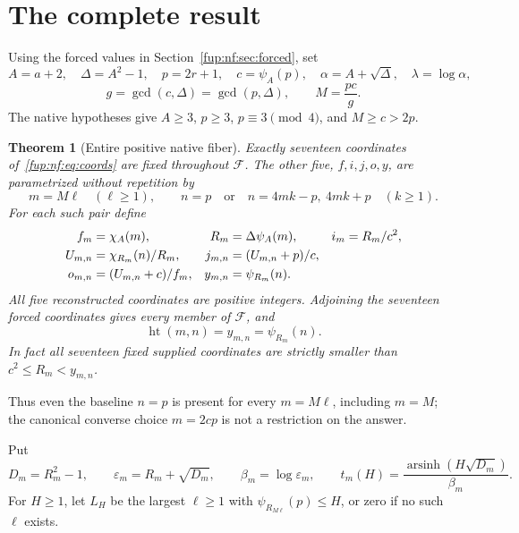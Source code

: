 \documentclass[11pt,letterpaper]{article}
\newtheorem{theorem}{Theorem}[section]
\theoremstyle{definition}\newtheorem{definition}[theorem]{Definition}
\theoremstyle{remark}\newtheorem{remark}[theorem]{Remark}
\DeclareMathOperator{\arsinh}{arsinh}
\begin{document}
\section{The complete result}\label{fup:nf:sec:main}
Using the forced values in Section~\ref{fup:nf:sec:forced}, set
\begin{equation}\label{fup:nf:eq:fixedparameters}
 A=a+2,\quad \Delta=A^2-1,\quad p=2r+1,\quad c=\psi_A(p),\quad
 \alpha=A+\sqrt\Delta,\quad \lambda=\log\alpha,
\end{equation}
\[
 g=\gcd(c,\Delta)=\gcd(p,\Delta),\qquad M=\frac{pc}{g}.
\]
The native hypotheses give $A\ge3$, $p\ge3$, $p\equiv3\pmod4$, and $M\ge c>2p$.

\begin{theorem}[Entire positive native fiber]\label{fup:nf:thm:class}
Exactly seventeen coordinates of~\eqref{fup:nf:eq:coords} are fixed throughout $\mathcal F$. The other five, $f,i,j,o,y$, are parametrized without repetition by
\begin{equation}\label{fup:nf:eq:indices}
 m=M\ell\quad(\ell\ge1),\qquad
 n=p\quad\text{or}\quad n=4mk-p,\ 4mk+p\quad(k\ge1).
\end{equation}
For each such pair define
\begin{align}\label{fup:nf:eq:reconstruct}
 f_m&=\chi_A(m),& R_m&=\Delta\psi_A(m),& i_m&=R_m/c^2,\notag\\
 U_{m,n}&=\chi_{R_m}(n)/R_m,& j_{m,n}&=(U_{m,n}+p)/c,\\
 o_{m,n}&=(U_{m,n}+c)/f_m,& y_{m,n}&=\psi_{R_m}(n).\notag
\end{align}
All five reconstructed coordinates are positive integers. Adjoining the seventeen forced coordinates gives every member of $\mathcal F$, and
\begin{equation}\label{fup:nf:eq:height}
 \operatorname{ht}(m,n)=y_{m,n}=\psi_{R_m}(n).
\end{equation}
In fact all seventeen fixed supplied coordinates are strictly smaller than $c^2\le R_m<y_{m,n}$.
\end{theorem}

Thus even the baseline $n=p$ is present for every $m=M\ell$, including $m=M$; the canonical converse choice $m=2cp$ is not a restriction on the answer.

Put
\[
 D_m=R_m^2-1,\qquad \varepsilon_m=R_m+\sqrt{D_m},\qquad
 \beta_m=\log\varepsilon_m,\qquad
 t_m(H)=\frac{\arsinh(H\sqrt{D_m})}{\beta_m}.
\]
For $H\ge1$, let $L_H$ be the largest $\ell\ge1$ with $\psi_{R_{M\ell}}(p)\le H$, or zero if no such $\ell$ exists.
\end{document}
